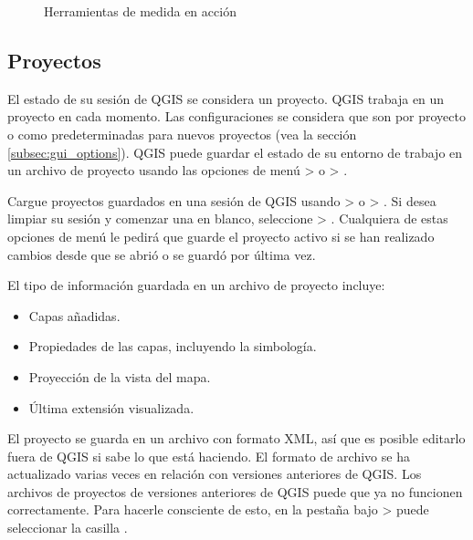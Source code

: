 \begin{figure}[h]
\caption{Herramientas de medida en acción \nixcaption} \label{fig:measure}
\centering
   \goodgap
\end{figure}

\subsection{Proyectos}\label{sec:projects}

El estado de su sesión de QGIS se considera un proyecto. QGIS
trabaja en un proyecto en cada momento. Las configuraciones se considera que son
por proyecto o como predeterminadas para nuevos proyectos (vea la sección \ref{subsec:gui_options}). QGIS puede guardar el estado de su entorno de trabajo
en un archivo de proyecto usando las opciones de menú 
 > 
o  > .

Cargue proyectos guardados en una sesión de QGIS usando  >  o  > . Si desea limpiar su sesión y comenzar una
en blanco, seleccione  > .
Cualquiera de estas opciones de menú le pedirá que guarde el proyecto activo si se han
realizado cambios desde que se abrió o se guardó por última vez.

El tipo de información guardada en un archivo de proyecto incluye:

\begin{itemize}
\item Capas añadidas.
\item Propiedades de las capas, incluyendo la simbología.
\item Proyección de la vista del mapa.
\item Última extensión visualizada.
\end{itemize}

El proyecto se guarda en un archivo con formato XML, así que es posible editarlo
fuera de QGIS si sabe lo que está haciendo. El formato de archivo se ha actualizado
varias veces en relación con versiones anteriores de QGIS. Los archivos de proyectos de versiones anteriores de QGIS puede que ya no funcionen correctamente. Para hacerle
consciente de esto, en la pestaña  bajo  >  puede seleccionar la casilla .

